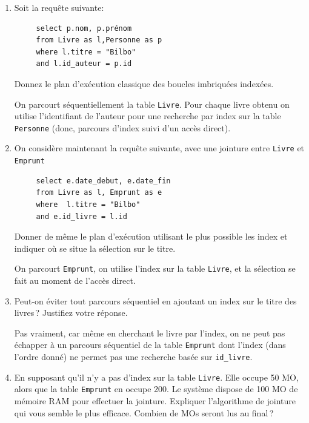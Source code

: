 \begin{enumerate}

   \item Soit la requête suivante:
  
\begin{verbatim}
     select p.nom, p.prénom
     from Livre as l,Personne as p
     where l.titre = "Bilbo"
     and l.id_auteur = p.id
\end{verbatim}

  Donnez le plan d'exécution classique des boucles imbriquées indexées.
     
\begin{solution}
On parcourt séquentiellement la table \texttt{Livre}. Pour chaque livre
obtenu on utilise l'identifiant de l'auteur pour une recherche par index
sur la table \texttt{Personne} (donc, parcours d'index suivi d'un accès direct).
\end{solution}

     
    \item On considère maintenant la requête suivante, avec une jointure entre \texttt{Livre}
    et \texttt{Emprunt} 
     
\begin{verbatim}
     select e.date_debut, e.date_fin 
     from Livre as l, Emprunt as e
     where  l.titre = "Bilbo"
     and e.id_livre = l.id
\end{verbatim}
 
     Donner de même le plan d'exécution utilisant le plus possible les index 
     et indiquer où se situe la sélection sur le titre.
 
  \begin{solution}
On parcourt \texttt{Emprunt}, on utilise l'index sur la table \texttt{Livre}, 
et la sélection se fait au moment de l'accès direct.
\end{solution}
        
     \item Peut-on éviter tout parcours séquentiel en ajoutant un index sur le titre des livres\,? Justifiez votre réponse.
     
\begin{solution}
Pas vraiment, car même en cherchant le livre par l'index, on ne
peut pas échapper  à un parcours séquentiel de la table \texttt{Emprunt}
dont l'index (dans l'ordre donné) ne permet pas une recherche basée sur \texttt{id\_livre}.
\end{solution}
 
  
  \item En supposant qu'il n'y a pas d'index sur la table \texttt{Livre}.
  Elle occupe 50 MO, alors que la table \texttt{Emprunt} en occupe 200. 
  Le système dispose de 100 MO de mémoire RAM pour effectuer la jointure. Expliquer
  l'algorithme de jointure qui vous semble le plus efficace. Combien de MOs seront  
  lus au final\,?
  

\end{enumerate}
